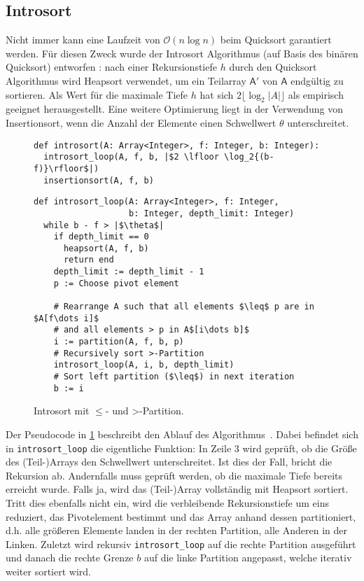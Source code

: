 \subsection{Introsort}
\label{section:introsort}

Nicht  immer kann eine Laufzeit von $\mathcal O(n\log{n})$ beim Quicksort garantiert werden.
Für diesen Zweck wurde der Introsort Algorithmus (auf Basis des binären Quicksort) entworfen \cite{Musser97}:
nach einer Rekursionstiefe $h$ durch den Quicksort Algorithmus wird Heapsort verwendet,
um ein Teilarray $\mathsf{A'}$ von $\mathsf A$ endgültig zu sortieren.
Als Wert für die maximale Tiefe $h$ hat sich $2 \lfloor \log_2{|A|}\rfloor$ als empirisch geeignet herausgestellt.
Eine weitere Optimierung liegt in der Verwendung von Insertionsort,
wenn die Anzahl der Elemente einen Schwellwert $\theta$ unterschreitet.

\begin{figure}
\begin{verbatim}
def introsort(A: Array<Integer>, f: Integer, b: Integer):
  introsort_loop(A, f, b, |$2 \lfloor \log_2{(b-f)}\rfloor$|)
  insertionsort(A, f, b)
\end{verbatim}

\begin{verbatim}
def introsort_loop(A: Array<Integer>, f: Integer,
                   b: Integer, depth_limit: Integer)
  while b - f > |$\theta$|
    if depth_limit == 0
      heapsort(A, f, b)
      return end
    depth_limit := depth_limit - 1
    p := Choose pivot element

    # Rearrange A such that all elements $\leq$ p are in $A[f\dots i]$
    # and all elements > p in A$[i\dots b]$
    i := partition(A, f, b, p)
    # Recursively sort >-Partition
    introsort_loop(A, i, b, depth_limit)
    # Sort left partition ($\leq$) in next iteration
    b := i

\end{verbatim}
\caption{Introsort mit \glqq $\leq$\grqq- und \glqq >\grqq-Partition.}
\label{alg:introsort}
\end{figure}

Der Pseudocode in \ref{alg:introsort} beschreibt den Ablauf des Algorithmus~\cite{Musser97}.
Dabei befindet sich in \texttt{introsort\_loop} die eigentliche Funktion: In Zeile 3 wird geprüft,
ob die Größe des (Teil-)Arrays den Schwellwert unterschreitet. Ist dies der Fall, bricht die Rekursion ab.
Andernfalls muss geprüft werden, ob die maximale Tiefe bereits erreicht wurde.
Falls ja, wird das (Teil-)Array vollständig mit Heapsort sortiert.
Tritt dies ebenfalls nicht ein, wird die verbleibende Rekursionstiefe um eins reduziert,
das Pivotelement bestimmt und das Array anhand dessen partitioniert,
d.h. alle größeren Elemente landen in der rechten Partition, alle Anderen in der Linken.
Zuletzt wird rekursiv \texttt{introsort\_loop} auf die rechte Partition ausgeführt
und danach die rechte Grenze $b$ auf die linke Partition angepasst, welche iterativ weiter sortiert wird.

